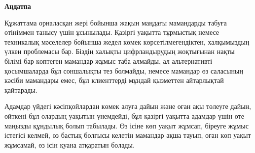 \newpage
\pagestyle{plain}

{
\begin{center}
    \Large
    \textbf{Аңдатпа}
\end{center}


Құжаттама орналасқан жері бойынша жақын маңдағы мамандарды табуға өтініммен танысу үшін ұсынылады. Қазіргі уақытта тұрмыстық немесе техникалық мәселелер бойынша жедел көмек көрсетілмегендіктен, халқымыздың үлкен проблемасы бар. Біздің халықты цифрландырудың жоқтығынан нақты білімі бар көптеген мамандар жұмыс таба алмайды, ал альтернативті қосымшаларда бұл соншалықты тез болмайды, немесе мамандар өз саласының кәсіби мамандары емес, бұл клиенттерді мұндай қызметтен айтарлықтай қайтарады.


Адамдар үйдегі кәсіпқойлардан көмек алуға дайын және оған ақы төлеуге дайын, өйткені бұл олардың уақытын үнемдейді, бұл қазіргі уақытта адамдар үшін өте маңызды құндылық болып табылады. Өз ісіне көп уақыт жұмсап, біреуге жұмыс істегісі келмей, өз бастық болғысы келетін мамандар ақша тауып, оған көп уақыт жұмсамай, өз ісін қуана атқаратын болады.
}
